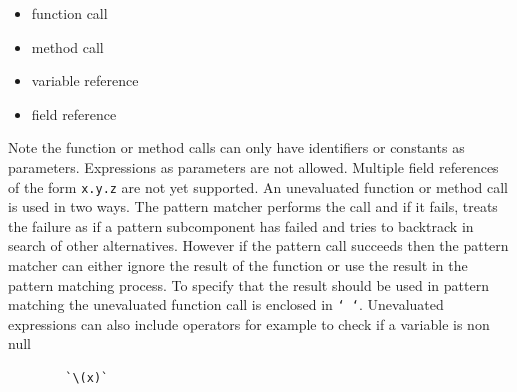 \documentclass[letterpaper,12pt]{article}
\begin{document}
\begin{itemize}
\item function call
\item method call
\item variable reference
\item field reference
\end{itemize}

Note the function or method calls can only have identifiers or
constants as parameters. Expressions as parameters are not
allowed. Multiple field references of the form \texttt{x.y.z} are
not yet supported. An unevaluated function or method call is used in two
ways. The pattern matcher performs the call and if it fails, treats the
failure as if a pattern subcomponent has failed and tries to
backtrack in search of other alternatives. However if the pattern call
succeeds then the pattern matcher can either ignore the result of the
function or use the result in the pattern matching process. To specify
that the result should be used in pattern matching the unevaluated
function call is enclosed in \texttt{` `}.  Unevaluated expressions
can also include operators for example to check if a variable is non
null

\begin{verbatim}
        `\(x)`
\end{verbatim}
\end{document}
